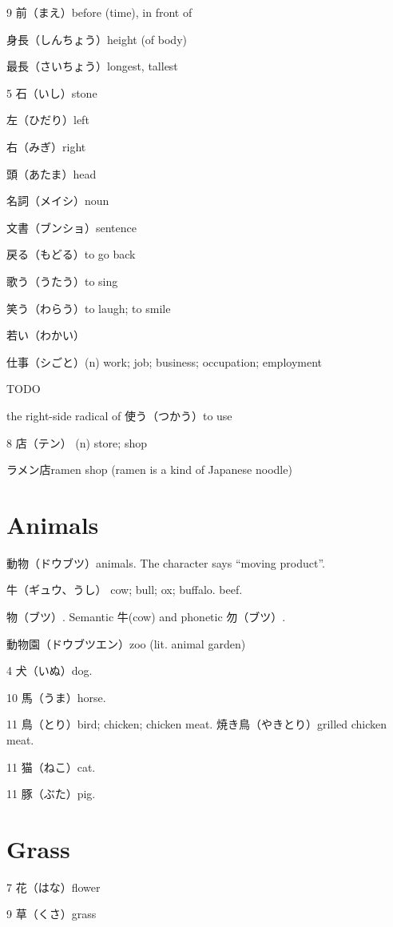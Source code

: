 9 前（まえ）before (time), in front of

身長（しんちょう）height (of body)

最長（さいちょう）longest, tallest

5 石（いし）stone

左（ひだり）left

右（みぎ）right

頭（あたま）head

名詞（メイシ）noun

文書（ブンショ）sentence

戻る（もどる）to go back

歌う（うたう）to sing

笑う（わらう）to laugh; to smile

若い（わかい）

仕事（シごと）(n) work; job; business; occupation; employment

TODO

the right-side radical of 使う（つかう）to use

8 店（テン） (n) store; shop

ラメン店ramen shop (ramen is a kind of Japanese noodle)

\section{Animals}

動物（ドウブツ）animals.
The character says ``moving product''.

牛（ギュウ、うし）
cow; bull; ox; buffalo.
beef.

物（ブツ）.
Semantic 牛(cow) and phonetic 勿（ブツ）.

動物園（ドウブツエン）zoo (lit. animal garden)

4 犬（いぬ）dog.

10 馬（うま）horse.

11 鳥（とり）bird; chicken; chicken meat.
焼き鳥（やきとり）grilled chicken meat.

11 猫（ねこ）cat.

11 豚（ぶた）pig.

\section{Grass}

7 花（はな）flower

9 草（くさ）grass

